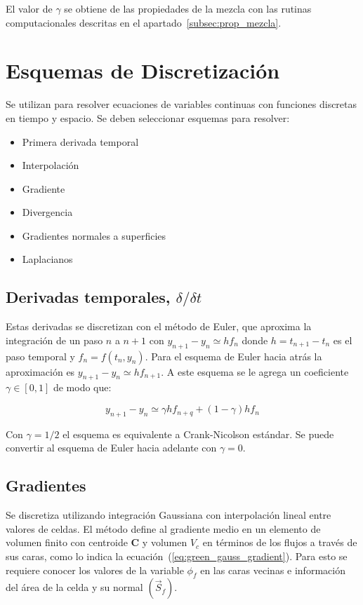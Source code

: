 El valor de $\gamma$ se obtiene de las propiedades de la mezcla con las rutinas
computacionales descritas en el apartado~\ref{subsec:prop_mezcla}.

\section{Esquemas de Discretización}

Se utilizan para resolver ecuaciones de variables continuas con funciones
discretas en tiempo y espacio.
%
Se deben seleccionar esquemas para resolver:

\begin{itemize}
  \item Primera derivada temporal
  \item Interpolación
  \item Gradiente
  \item Divergencia
  \item Gradientes normales a superficies
  \item Laplacianos
\end{itemize}


\subsection{Derivadas temporales, $\delta / \delta t$}
%
Estas derivadas se discretizan con el método de Euler\parencite{burden}, que
aproxima la integración de un paso $n$ a $n+1$ con $y_{n+1}-y_{n}\simeq hf_{n}$
donde $h = t_{n+1}-t_{n}$ es el paso temporal y $f_{n}=f(t_{n},y_{n})$.
%
Para el esquema de Euler hacia atrás la aproximación es
$y_{n+1}-y_{n}\simeq h f_{n+1}$.
%
A este esquema se le agrega un coeficiente $\gamma\in[0,1]$ de modo que:

\begin{equation}
  y_{n+1}-y_{n} \simeq \gamma h f_{n+q} + (1-\gamma)h f_{n}
\end{equation}

Con $\gamma=1/2$ el esquema es equivalente a Crank-Nicolson estándar.
%
Se puede convertir al esquema de Euler hacia adelante con $\gamma=0$.

\subsection{Gradientes}
%
Se discretiza utilizando integración Gaussiana con interpolación lineal entre
valores de celdas.
%
El método define al gradiente medio en un elemento de volumen finito con
centroide \textbf{C} y volumen $V_{c}$ en términos de los flujos a través de sus
caras, como lo indica la ecuación~(\ref{eq:green_gauss_gradient}).
%
Para esto se requiere conocer los valores de la variable $\phi_{f}$ en las caras
vecinas e información del área de la celda y su normal $(\vec{S}_{f})$.


